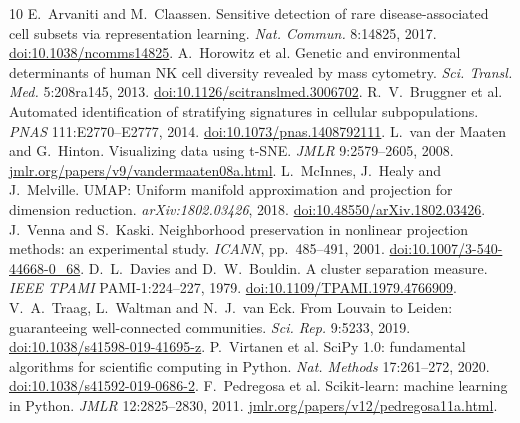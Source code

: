 \begingroup
\footnotesize
\raggedright
\setlength{\bibsep}{1.5pt}
\begin{thebibliography}{10}
 E.~Arvaniti and M.~Claassen. Sensitive detection of rare disease-associated cell subsets via representation learning. \emph{Nat. Commun.} 8:14825, 2017. \href{https://doi.org/10.1038/ncomms14825}{doi:10.1038/ncomms14825}.
 A.~Horowitz et al. Genetic and environmental determinants of human NK cell diversity revealed by mass cytometry. \emph{Sci. Transl. Med.} 5:208ra145, 2013. \href{https://doi.org/10.1126/scitranslmed.3006702}{doi:10.1126/scitranslmed.3006702}.
 R.~V.~Bruggner et al. Automated identification of stratifying signatures in cellular subpopulations. \emph{PNAS} 111:E2770--E2777, 2014. \href{https://doi.org/10.1073/pnas.1408792111}{doi:10.1073/pnas.1408792111}.
 L.~van der Maaten and G.~Hinton. Visualizing data using t-SNE. \emph{JMLR} 9:2579--2605, 2008. \href{https://www.jmlr.org/papers/v9/vandermaaten08a.html}{jmlr.org/papers/v9/vandermaaten08a.html}.
 L.~McInnes, J.~Healy and J.~Melville. UMAP: Uniform manifold approximation and projection for dimension reduction. \emph{arXiv:1802.03426}, 2018. \href{https://doi.org/10.48550/arXiv.1802.03426}{doi:10.48550/arXiv.1802.03426}.
 J.~Venna and S.~Kaski. Neighborhood preservation in nonlinear projection methods: an experimental study. \emph{ICANN}, pp.~485--491, 2001. \href{https://doi.org/10.1007/3-540-44668-0_68}{doi:10.1007/3-540-44668-0\_68}.
 D.~L.~Davies and D.~W.~Bouldin. A cluster separation measure. \emph{IEEE TPAMI} PAMI-1:224--227, 1979. \href{https://doi.org/10.1109/TPAMI.1979.4766909}{doi:10.1109/TPAMI.1979.4766909}.
 V.~A.~Traag, L.~Waltman and N.~J.~van Eck. From Louvain to Leiden: guaranteeing well-connected communities. \emph{Sci. Rep.} 9:5233, 2019. \href{https://doi.org/10.1038/s41598-019-41695-z}{doi:10.1038/s41598-019-41695-z}.
 P.~Virtanen et al. SciPy 1.0: fundamental algorithms for scientific computing in Python. \emph{Nat. Methods} 17:261--272, 2020. \href{https://doi.org/10.1038/s41592-019-0686-2}{doi:10.1038/s41592-019-0686-2}.
 F.~Pedregosa et al. Scikit-learn: machine learning in Python. \emph{JMLR} 12:2825--2830, 2011. \href{https://www.jmlr.org/papers/v12/pedregosa11a.html}{jmlr.org/papers/v12/pedregosa11a.html}.
\end{thebibliography}
\endgroup

